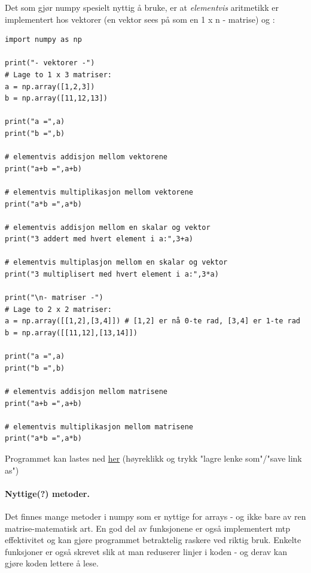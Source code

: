 \documentclass[%
oneside,                 %
final,                   %
10pt,norsk]{article}
\begin{document}
Det som gjør numpy spesielt nyttig å bruke, er at \emph{elementvis} aritmetikk er implementert hos vektorer (en vektor sees på som en 1 x n - matrise) og :
\begin{verbatim}
import numpy as np

print("- vektorer -")
# Lage to 1 x 3 matriser:
a = np.array([1,2,3])
b = np.array([11,12,13])

print("a =",a)
print("b =",b)

# elementvis addisjon mellom vektorene
print("a+b =",a+b)

# elementvis multiplikasjon mellom vektorene
print("a*b =",a*b)

# elementvis addisjon mellom en skalar og vektor
print("3 addert med hvert element i a:",3+a)

# elementvis multiplasjon mellom en skalar og vektor
print("3 multiplisert med hvert element i a:",3*a)

print("\n- matriser -")
# Lage to 2 x 2 matriser:
a = np.array([[1,2],[3,4]]) # [1,2] er nå 0-te rad, [3,4] er 1-te rad
b = np.array([[11,12],[13,14]])

print("a =",a)
print("b =",b)

# elementvis addisjon mellom matrisene
print("a+b =",a+b)

# elementvis multiplikasjon mellom matrisene
print("a*b =",a*b)
\end{verbatim}
Programmet kan lastes ned \href{{https://github.com/krisbhei/INF2310/raw/master/Programmering/Python/aritmetikk_numpy.py}}{her} (høyreklikk og trykk "lagre lenke som"/"save link as")


\paragraph{Nyttige(?) metoder.}
Det finnes mange metoder i numpy som er nyttige for arrays - og ikke bare av ren matrise-matematisk art.
En god del av funksjonene er også implementert mtp effektivitet og kan gjøre programmet betraktelig raskere ved riktig bruk.
Enkelte funksjoner er også skrevet slik at man reduserer linjer i koden - og derav kan gjøre koden lettere å lese.



\vspace{3mm}
\end{document}
